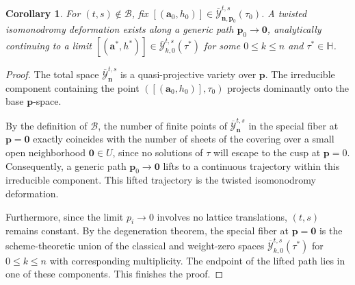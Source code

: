 \documentclass[11pt]{amsart}
\newtheorem{corollary}[theorem]{Corollary}
\theoremstyle{remark}
\numberwithin{equation}{section}
\begin{document}
\begin{corollary}\label{cor:isomo_deform}
For $(t,s) \notin \mathcal{B}$, fix $[(\mathbf{a}_0, h_0)] \in \overline{\mathcal{Y}}^{t,s}_{\mathbf{n}, \mathbf{p}_0}(\tau_0)$. A twisted isomonodromy deformation exists along a generic path $\mathbf{p}_0 \to \mathbf{0}$, analytically continuing to a limit $[(\mathbf{a}^*, h^*)] \in \overline{\mathcal{Y}}^{t,s}_{k,0}(\tau^*)$ for some $0 \leq k \leq n$ and $\tau^* \in \mathbb{H}$.
\end{corollary}

\begin{proof}
The total space $\overline{\mathcal{Y}}^{t,s}_{\mathbf{n}}$ is a quasi-projective variety over $\mathbf{p}$. The irreducible component containing the point $([(\mathbf{a}_0, h_0)], \tau_0)$ projects dominantly onto the base $\mathbf{p}$-space. 

By the definition of $\mathcal{B}$, the number of finite points of $\overline{\mathcal{Y}}^{t,s}_{\mathbf{n}}$ in the special fiber at $\mathbf{p} = \mathbf{0}$ exactly coincides with the number of sheets of the covering over a small open neighborhood $\mathbf{0} \in U$, since no solutions of $\tau$ will escape to the cusp at $\mathbf{p}=0$. Consequently, a generic path $\mathbf{p}_0 \to \mathbf{0}$ lifts to a continuous trajectory within this irreducible component. This lifted trajectory is the twisted isomonodromy deformation.

Furthermore, since the limit $p_i \to 0$ involves no lattice translations, $(t,s)$ remains constant. By the degeneration theorem, the special fiber at $\mathbf{p} = \mathbf{0}$ is the scheme-theoretic union of the classical and weight-zero spaces $\overline{\mathcal{Y}}^{t,s}_{k,0}(\tau^*)$ for $0 \leq k \leq n$ with corresponding multiplicity. The endpoint of the lifted path lies in one of these components. This finishes the proof.
\end{proof}
\end{document}

